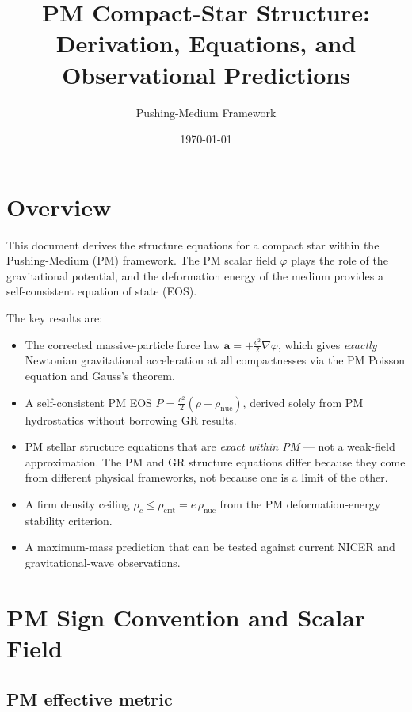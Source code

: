 \documentclass[11pt,a4paper]{article}
\title{PM Compact-Star Structure:\\Derivation, Equations, and Observational Predictions}
\author{Pushing-Medium Framework}
\date{\today}
\newcommand{\rhonuc}{\rho_\text{nuc}}
\newcommand{\rhocrit}{\rho_\text{crit}}
\begin{document}
\maketitle
\tableofcontents
\newpage

\section{Overview}

This document derives the structure equations for a compact star within the
Pushing-Medium (PM) framework.  The PM scalar field $\varphi$ plays the role
of the gravitational potential, and the deformation energy of the medium
provides a self-consistent equation of state (EOS).

The key results are:
\begin{itemize}
  \item The corrected massive-particle force law $\mathbf{a} = +\tfrac{c^2}{2}\nabla\varphi$,
    which gives \emph{exactly} Newtonian gravitational acceleration at all
    compactnesses via the PM Poisson equation and Gauss's theorem.
  \item A self-consistent PM EOS $P = \tfrac{c^2}{2}(\rho - \rhonuc)$, derived
    solely from PM hydrostatics without borrowing GR results.
  \item PM stellar structure equations that are \emph{exact within PM} — not
    a weak-field approximation.  The PM and GR structure equations differ
    because they come from different physical frameworks, not because one is
    a limit of the other.
  \item A firm density ceiling $\rho_c \le \rhocrit = e\,\rhonuc$ from the
    PM deformation-energy stability criterion.
  \item A maximum-mass prediction that can be tested against current NICER
    and gravitational-wave observations.
\end{itemize}

\section{PM Sign Convention and Scalar Field}

\subsection{PM effective metric}
\end{document}
